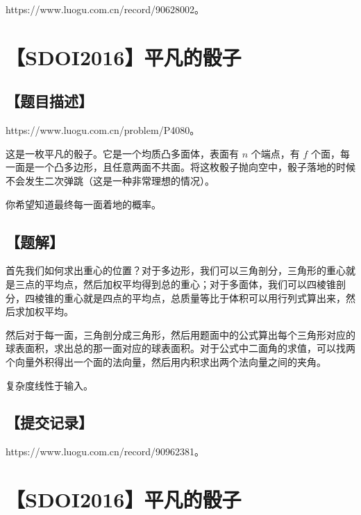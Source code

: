 \documentclass[UTF8,12pt,a4paper]{ctexart}
\begin{document}
	https://www.luogu.com.cn/record/90628002。
	
	
	\section*{【SDOI2016】平凡的骰子}
	
	\subsection*{【题目描述】}
	
	https://www.luogu.com.cn/problem/P4080。
	
	这是一枚平凡的骰子。它是一个均质凸多面体，表面有 $n$ 个端点，有 $f$ 个面，每一面是一个凸多边形，且任意两面不共面。将这枚骰子抛向空中，骰子落地的时候不会发生二次弹跳（这是一种非常理想的情况）。
	
	你希望知道最终每一面着地的概率。
	
	\subsection*{【题解】}
	
	首先我们如何求出重心的位置？对于多边形，我们可以三角剖分，三角形的重心就是三点的平均点，然后加权平均得到总的重心；对于多面体，我们可以四棱锥剖分，四棱锥的重心就是四点的平均点，总质量等比于体积可以用行列式算出来，然后求加权平均。
	
	然后对于每一面，三角剖分成三角形，然后用题面中的公式算出每个三角形对应的球表面积，求出总的那一面对应的球表面积。对于公式中二面角的求值，可以找两个向量外积得出一个面的法向量，然后用内积求出两个法向量之间的夹角。
	
	复杂度线性于输入。
	
	\subsection*{【提交记录】}
	
	https://www.luogu.com.cn/record/90962381。
	
	
	\section*{【SDOI2016】平凡的骰子}
	
\end{document}
